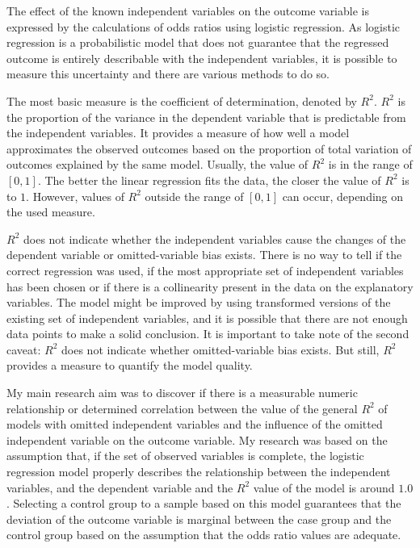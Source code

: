   
        The effect of the known independent variables on the outcome variable is expressed by the calculations of odds ratios using logistic regression. As logistic regression is a probabilistic model that does not guarantee that the regressed outcome is entirely describable with the independent variables, it is possible to measure this uncertainty and there are various methods to do so.

        The most basic measure is the coefficient of determination, denoted by $R^2$. $R^2$ is the proportion of the variance in the dependent variable that is predictable from the independent variables. It provides a measure of how well a model approximates the observed outcomes based on the proportion of total variation of outcomes explained by the same model. Usually, the value of $R^2$ is in the range of $[0,1]$. The better the linear regression fits the data, the closer the value of $R^2$ is to $1$. However, values of $R^2$ outside the range of $[0,1]$ can occur, depending on the used measure.
								
		$R^2$ does not indicate whether the independent variables cause the changes of the dependent variable or omitted-variable bias exists. There is no way to tell if the correct regression was used, if the most appropriate set of independent variables has been chosen or if there is a collinearity present in the data on the explanatory variables. The model might be improved by using transformed versions of the existing set of independent variables, and it is possible that there are not enough data points to make a solid conclusion. It is important to take note of the second caveat: $R^2$ does not indicate whether omitted-variable bias exists. But still, $R^2$ provides a measure to quantify the model quality.								
				
		My main research aim was to discover if there is a measurable numeric relationship or determined correlation between the value of the general $R^2$ of models with omitted independent variables and the influence of the omitted independent variable on the outcome variable. My research was based on the assumption that, if the set of observed variables is complete, the logistic regression model properly describes the relationship between the independent variables, and the dependent variable and the $R^2$ value of the model is around $1.0$. Selecting a control group to a sample based on this model guarantees that the deviation of the outcome variable is marginal between the case group and the control group based on the assumption that the odds ratio values are adequate.

